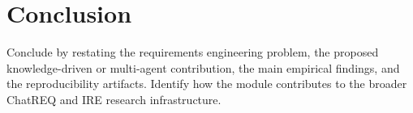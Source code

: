 \section{Conclusion}

Conclude by restating the requirements engineering problem, the proposed knowledge-driven or multi-agent contribution, the main empirical findings, and the reproducibility artifacts. Identify how the module contributes to the broader ChatREQ and IRE research infrastructure.

